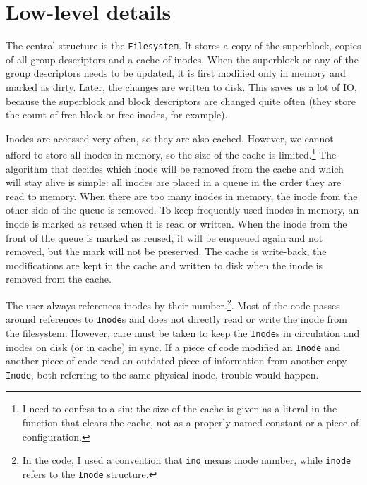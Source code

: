 \chapter{Low-level details}

The central structure is the \texttt{Filesystem}. It stores a copy of the
superblock, copies of all group descriptors and a cache of inodes. When the
superblock or any of the group descriptors needs to be updated, it is first
modified only in memory and marked as dirty. Later, the changes are written to
disk. This saves us a lot of IO, because the superblock and block descriptors
are changed quite often (they store the count of free block or free inodes, for
example).

Inodes are accessed very often, so they are also cached. However, we cannot
afford to store all inodes in memory, so the size of the cache is
limited.\footnote{I need to confess to a sin: the size of the cache is given as
a literal in the function that clears the cache, not as a properly named
constant or a piece of configuration.} The algorithm that decides which inode
will be removed from the cache and which will stay alive is simple: all inodes
are placed in a queue in the order they are read to memory. When there are too
many inodes in memory, the inode from the other side of the queue is removed. To
keep frequently used inodes in memory, an inode is marked as reused when it is
read or written. When the inode from the front of the queue is marked as reused,
it will be enqueued again and not removed, but the mark will not be preserved.
The cache is write-back, the modifications are kept in the cache and written to
disk when the inode is removed from the cache.

The user always references inodes by their number.\footnote{In the code, I used
a convention that \texttt{ino} means inode number, while \texttt{inode} refers
to the \texttt{Inode} structure.}. Most of the code passes around references to
\texttt{Inode}s and does not directly read or write the inode from the
filesystem. However, care must be taken to keep the \texttt{Inode}s in
circulation and inodes on disk (or in cache) in sync. If a piece of code
modified an \texttt{Inode} and another piece of code read an outdated piece of
information from another copy \texttt{Inode}, both referring to the same
physical inode, trouble would happen.

